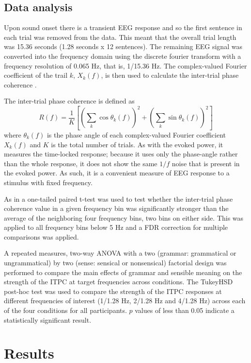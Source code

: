\documentclass[a4paper,10pt,twoside]{article}
\begin{document}
\subsection*{Data analysis}

Upon sound onset there is a transient EEG response and so the first
sentence in each trial was removed from the data. This meant that the
overall trial length was 15.36 seconds (1.28 seconds x 12
sentences). The remaining EEG signal was converted into the frequency
domain using the discrete fourier transform with a frequency
resolution of 0.065 Hz, that is, 1/15.36 Hz. The complex-valued
Fourier coefficient of the trail $k$, $X_k(f)$, is then used to
calculate the inter-trial phase coherence .

The inter-trial phase coherence is defined as
\begin{equation}
\label{eq:itpc}
R(f)=\frac{1}{K}\left[\left(\sum_k{\cos{\theta_k(f)}}\right)^2+\left(\sum_k{\sin{\theta_k(f)}}\right)^2\right]
\end{equation}
where $\theta_k(f)$ is the phase angle of each complex-valued Fourier
coefficient $X_k(f)$ and $K$ is the total number of trials. As with
the evoked power, it measures the time-locked response; because it
uses only the phase-angle rather than the whole response, it does not
show the same $1/f$ noise that is present in the evoked power. As
such, it is a convenient measure of EEG response to a stimulus with
fixed frequency.

As in \cite{DingEtAl2016} a one-tailed paired t-test was used to test
whether the inter-trial phase coherence value in a given frequency bin
was significantly stronger than the average of the neighboring four
frequency bins, two bins on either side. This was applied to all
frequency bins below 5 Hz and a FDR correction for multiple
comparisons was applied.

A repeated measures, two-way ANOVA with a two (grammar: grammatical or
ungrammatical) by two (sense: sensical or nonsensical) factorial
design was performed to compare the main effects of grammar and
sensible meaning on the strength of the ITPC at target frequencies
across conditions. The TukeyHSD post-hoc test was used to compare the
strength of the ITPC responses at different frequencies of interest
(1/1.28 Hz, 2/1.28 Hz and 4/1.28 Hz) across each of the four
conditions for all participants. $p$ values of less than 0.05 indicate
a statistically significant result.


\section*{Results}
\end{document}
